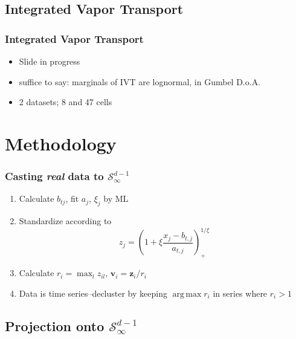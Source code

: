 \documentclass[aspectratio=169]{beamer}
\DeclareMathOperator*{\argmax}{arg\,max}
\begin{document}
\subsection{Integrated Vapor Transport}
\begin{frame}
  \frametitle{Integrated Vapor Transport}
  \begin{itemize}
      \item Slide in progress
      \item suffice to say: marginals of IVT are lognormal, in Gumbel D.o.A.
      \item 2 datasets; 8 and 47 cells
  \end{itemize}
\end{frame}

\section{Methodology}

\begin{frame}
  \frametitle{Casting \emph{real} data to $\mathcal{S}_{\infty}^{d-1}$}
  \begin{enumerate}
      \item Calculate $b_{tj}$, fit $a_j$, $\xi_j$ by ML
      \item Standardize according to
        \begin{equation*}
         z_j = \left(1 + \xi\frac{x_j - b_{t,j}}{a_{t,j}}\right)_{+}^{1/\xi}
        \end{equation*}
      \item Calculate $r_i = \max_lz_{il}$, $\bm{v}_i = \bm{z}_i / r_i$
      \item Data is time series--decluster by keeping $\argmax r_i$ in series where $r_i > 1$
  \end{enumerate}
\end{frame}

\subsection{Projection onto $\mathcal{S}_{\infty}^{d-1}$}
\end{document}
